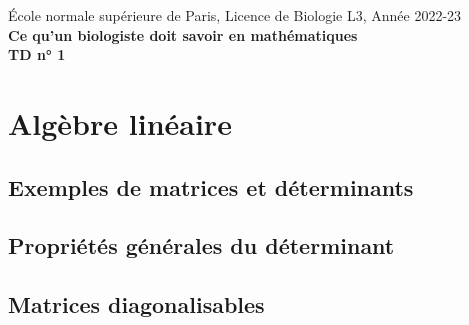 \documentclass[french, 12pt]{article}
\numberwithin{exercise}{section}
\numberwithin{equation}{section}
\begin{document}
\begin{center}
  \small{\sc \'Ecole normale supérieure de Paris, Licence de Biologie L3, Année 2022-23} \\
  \bigskip
  \large{\bf Ce qu'un biologiste doit savoir en mathématiques} \\
  \bigskip  
  {\bf TD n° 1}
\end{center}

\section{Algèbre linéaire} 
\newcommand{\alglin}{/home/robin/ENSEIGN/Cours/MathBiologie/L3-ENS-Math1/Exercices/AlgLin}

\subsection{Exemples de matrices et déterminants}%







\subsection{Propriétés générales du déterminant}%





\subsection{Matrices diagonalisables}%





\end{document}
